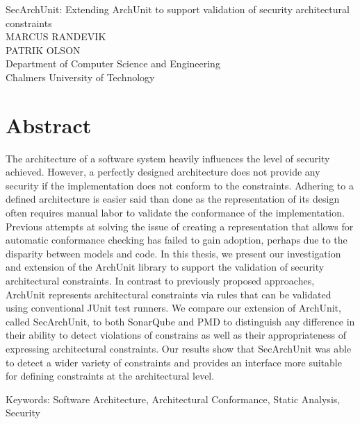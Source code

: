 SecArchUnit: Extending ArchUnit to support validation of security architectural constraints\\
MARCUS RANDEVIK\\
PATRIK OLSON\\
Department of Computer Science and Engineering\\
Chalmers University of Technology \setlength{\parskip}{0.5cm}

\thispagestyle{plain}			%
\setlength{\parskip}{0pt plus 1.0pt}
\section*{Abstract}
The architecture of a software system heavily influences the level of security achieved.  However, a perfectly designed architecture does not provide any security if the implementation does not conform to the constraints. Adhering to a defined architecture is easier said than done as the representation of its design often requires manual labor to validate the conformance of the implementation. Previous attempts at solving the issue of creating a representation that allows for automatic conformance checking has failed to gain adoption, perhaps due to the disparity between models and code. In this thesis, we present our investigation and extension of the ArchUnit library to support the validation of security architectural constraints. In contrast to previously proposed approaches, ArchUnit represents architectural constraints via rules that can be validated using conventional JUnit test runners.  We compare our extension of ArchUnit, called SecArchUnit, to both SonarQube and PMD to distinguish any difference in their ability to detect violations of constrains as well as their appropriateness of expressing architectural constraints. Our results show that SecArchUnit was able to detect a wider variety of constraints and provides an interface more suitable for defining constraints at the architectural level.

\vfill
Keywords: Software Architecture, Architectural Conformance, Static Analysis, Security

\newpage				%
\thispagestyle{empty}
\mbox{}